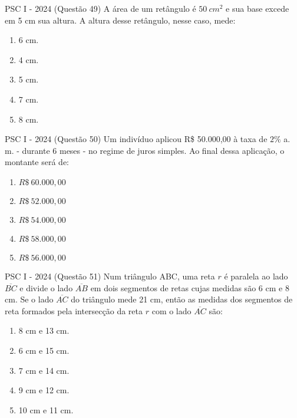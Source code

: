 \documentclass[aspectratio=169]{beamer}
\newif\ifusarcorvermelha
\newcommand{\vermelho}[1]{%
    \ifusarcorvermelha
        {\color{red}#1}%
    \else
        #1%
    \fi
}
\begin{document}
    \begin{frame}{PSC I - 2024 (Questão 49)}
        A área de um retângulo é $50 \ cm^{2}$ e sua base excede em 5 cm sua altura. A altura desse retângulo, nesse caso, mede:
        
            \begin{enumerate}[a]
                \item 6 cm.
                \item 4 cm.
                \item \vermelho{5 cm.} %
                \item 7 cm.
                \item 8 cm.
            \end{enumerate}
            
    \end{frame}

    \begin{frame}{PSC I - 2024 (Questão 50)}
    Um indivíduo aplicou R\$ 50.000,00 à taxa de $2\%$ a. m. - durante 6 meses - no regime de juros simples. Ao final dessa aplicação, o montante será de:

        \begin{enumerate}[a]
            \item $R\$ \ 60.000,00$
            \item $R\$ \ 52.000,00$
            \item $R\$ \ 54.000,00$
            \item $R\$ \ 58.000,00$
            \item \vermelho{$R\$ \ 56.000,00$} %
        \end{enumerate}
                
    \end{frame}


    \begin{frame}{PSC I - 2024 (Questão 51)}
        Num triângulo ABC, uma reta $r$ é paralela ao lado $\overline{BC}$ e divide o lado $\overline{AB}$ em dois segmentos de retas cujas medidas são 6 cm e 8 cm. Se o lado $\overline{AC}$ do triângulo mede 21 cm, então as medidas dos segmentos de reta formados pela intersecção da reta $r$ com o lado $\overline{AC}$ são:

        
        \begin{enumerate}[a]
            \item 8 cm e 13 cm.
            \item 6 cm e 15 cm.
            \item 7 cm e 14 cm.
            \item \vermelho{9 cm e 12 cm.} %
            \item 10 cm e 11 cm.
        \end{enumerate}
      
    \end{frame}
\end{document}
